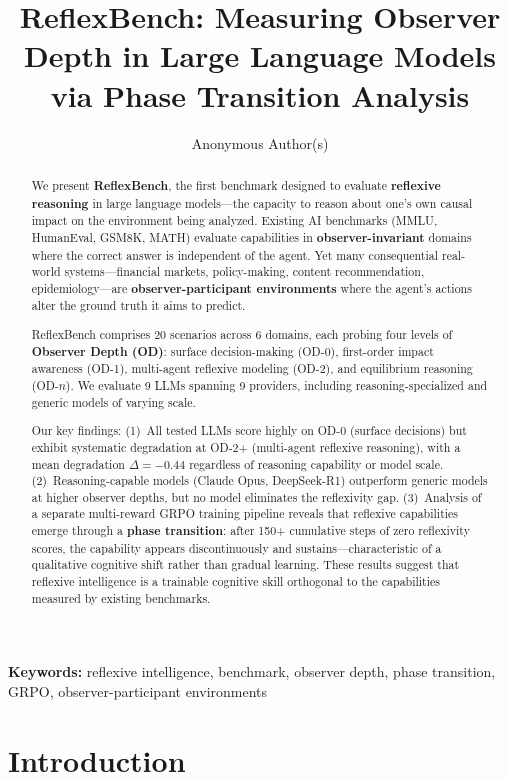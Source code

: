 \documentclass{article}
\title{ReflexBench: Measuring Observer Depth in Large Language Models\\via Phase Transition Analysis}
\author{
  Anonymous Author(s)
}
\begin{document}
\maketitle

\begin{abstract}
We present \textbf{ReflexBench}, the first benchmark designed to evaluate \textbf{reflexive reasoning} in large language models---the capacity to reason about one's own causal impact on the environment being analyzed. Existing AI benchmarks (MMLU, HumanEval, GSM8K, MATH) evaluate capabilities in \textbf{observer-invariant} domains where the correct answer is independent of the agent. Yet many consequential real-world systems---financial markets, policy-making, content recommendation, epidemiology---are \textbf{observer-participant environments} where the agent's actions alter the ground truth it aims to predict.

ReflexBench comprises 20 scenarios across 6 domains, each probing four levels of \textbf{Observer Depth (OD)}: surface decision-making (OD-0), first-order impact awareness (OD-1), multi-agent reflexive modeling (OD-2), and equilibrium reasoning (OD-$n$). We evaluate 9 LLMs spanning 9 providers, including reasoning-specialized and generic models of varying scale.

Our key findings: (1)~All tested LLMs score highly on OD-0 (surface decisions) but exhibit systematic degradation at OD-2+ (multi-agent reflexive reasoning), with a mean degradation $\Delta = -0.44$ regardless of reasoning capability or model scale. (2)~Reasoning-capable models (Claude Opus, DeepSeek-R1) outperform generic models at higher observer depths, but no model eliminates the reflexivity gap. (3)~Analysis of a separate multi-reward GRPO training pipeline reveals that reflexive capabilities emerge through a \textbf{phase transition}: after 150+ cumulative steps of zero reflexivity scores, the capability appears discontinuously and sustains---characteristic of a qualitative cognitive shift rather than gradual learning. These results suggest that reflexive intelligence is a trainable cognitive skill orthogonal to the capabilities measured by existing benchmarks.
\end{abstract}

\noindent\textbf{Keywords:} reflexive intelligence, benchmark, observer depth, phase transition, GRPO, observer-participant environments

\section{Introduction}
\label{sec:intro}
\end{document}

